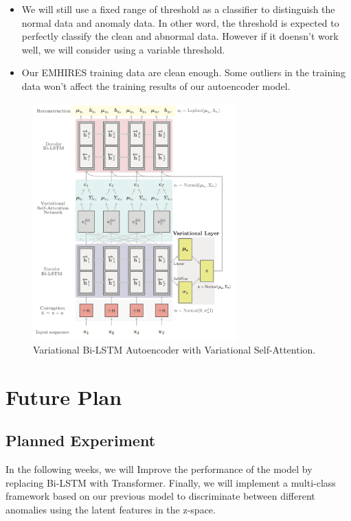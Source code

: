\documentclass{article}
\begin{document}
\begin{itemize}
\item We will still use a fixed range of threshold as a classifier to distinguish the normal data and anomaly data. In other word, the threshold is expected to perfectly classify the clean and abnormal data. However if it doensn't work well, we will consider using a variable threshold.

\item Our EMHIRES training data are clean enough. Some outliers in the training data won't affect the training results of our autoencoder model.

\end{itemize}
\begin{figure}[!t]
    \centering
    \includegraphics[width=0.7\textwidth]{images/BiLSTM.png}
    \caption{Variational Bi-LSTM Autoencoder with Variational Self-Attention.}
\end{figure}

\section{Future Plan}

\subsection{Planned Experiment}
In the following weeks, we will Improve the performance of the model by replacing Bi-LSTM with Transformer. Finally, we will implement a multi-class framework based on our previous model to discriminate between different anomalies using the latent features in the z-space.
\end{document}
